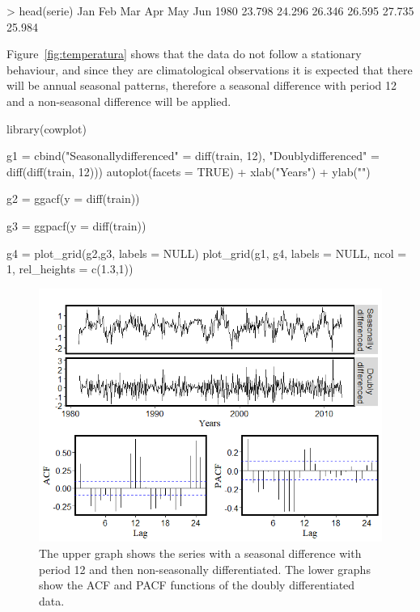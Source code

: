 %
\begin{example*}
	> head(serie)
	Jan    Feb    Mar    Apr    May    Jun
	1980 23.798 24.296 26.346 26.595 27.735 25.984
\end{example*}

Figure~\ref{fig:temperatura} shows that the data do not follow a stationary behaviour, and since they are climatological observations it is expected that there will be annual seasonal patterns, therefore a seasonal difference with period 12 and a non-seasonal difference will be applied.
%
\begin{example*}
	library(cowplot)
	
	g1 = cbind("Seasonally\n differenced" = diff(train, 12),
	"Doubly\n differenced" = diff(diff(train, 12))) %
	autoplot(facets = TRUE) + xlab("Years") + ylab("") 
	
	g2 = ggacf(y = diff(train)) 
	
	g3 = ggpacf(y = diff(train)) 
	
	g4 = plot_grid(g2,g3, labels = NULL)
	plot_grid(g1, g4, labels = NULL, ncol = 1, rel_heights = c(1.3,1))
\end{example*}
\begin{figure}[ht!]
	\centering
	\includegraphics[scale=0.6]{Figs/44}
	\caption{The upper graph shows the series with a seasonal difference with period 12 and then non-seasonally differentiated. The lower graphs show the ACF and PACF functions of the doubly differentiated data.}
	\label{fig:dif}
\end{figure}
